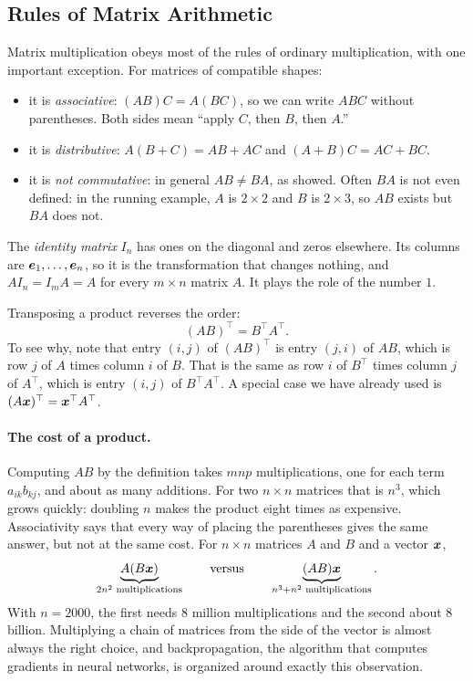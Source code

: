 \subsection{Rules of Matrix Arithmetic}
\label{sec:ch03-matmul-rules}

Matrix multiplication obeys most of the rules of ordinary multiplication,
with one important exception. For matrices of compatible shapes:
\begin{itemize}
  \item it is \emph{associative}: $(AB)C = A(BC)$, so we can write $ABC$
    without parentheses. Both sides mean ``apply $C$, then $B$, then $A$.''
  \item it is \emph{distributive}: $A(B + C) = AB + AC$ and
    $(A + B)C = AC + BC$.
  \item it is \emph{not commutative}: in general $AB \ne BA$, as
     showed. Often $BA$ is not even defined: in
    the running example, $A$ is $2 \times 2$ and $B$ is $2 \times 3$, so
    $AB$ exists but $BA$ does not.
\end{itemize}

The \emph{identity matrix} $I_n$ has ones on the diagonal and zeros
elsewhere. Its columns are $\bm{e}_1, \dots, \bm{e}_n$, so it is the
transformation that changes nothing, and $AI_n = I_m A = A$ for every
$m \times n$ matrix $A$. It plays the role of the number $1$.

Transposing a product reverses the order:
\begin{equation}
  (AB)^\top = B^\top A^\top .
  \label{eq:ch03-transpose-product}
\end{equation}
To see why, note that entry $(i, j)$ of $(AB)^\top$ is entry $(j, i)$ of
$AB$, which is row $j$ of $A$ times column $i$ of $B$. That is the same as
row $i$ of $B^\top$ times column $j$ of $A^\top$, which is entry $(i, j)$
of $B^\top A^\top$. A special case we have already used is
$(A\bm{x})^\top = \bm{x}^\top A^\top$.

\paragraph{The cost of a product.}
Computing $AB$ by the definition takes $mnp$ multiplications, one for each
term $a_{ik} b_{kj}$, and about as many additions. For two $n \times n$
matrices that is $n^3$, which grows quickly: doubling $n$ makes the
product eight times as expensive. Associativity says that every way of
placing the parentheses gives the same answer, but not at the same cost.
For $n \times n$ matrices $A$ and $B$ and a vector $\bm{x}$,
\[
  \underbrace{A(B\bm{x})}_{2n^2 \text{ multiplications}}
  \qquad\text{versus}\qquad
  \underbrace{(AB)\bm{x}}_{n^3 + n^2 \text{ multiplications}} .
\]
With $n = 2000$, the first needs $8$ million multiplications and the
second about $8$ billion. Multiplying a chain of matrices from the side
of the vector is almost always the right choice, and backpropagation, the
algorithm that computes gradients in neural networks, is organized around
exactly this observation.


